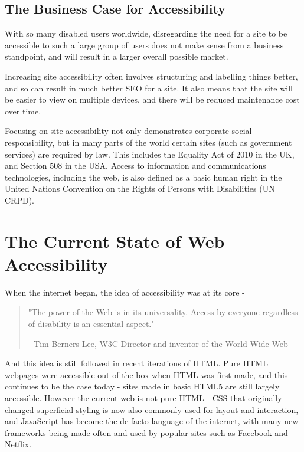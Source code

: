 \documentclass[ %
                    author={Aleena Baig},
                supervisor={Dr Simon Lock},
                    degree={BSc},
                     title={On Making Web Accessible Graphs},
                  subtitle={},
                      year={2019} ]{dissertation}
\begin{document}
\subsection{The Business Case for Accessibility}

With so many disabled users worldwide, disregarding the need for a site to be accessible to such a large group of users does not make sense from a business standpoint, and will result in a larger overall possible market.

Increasing site accessibility often involves structuring and labelling things better, and so can result in much better SEO for a site. It also means that the site will be easier to view on multiple devices, and there will be reduced maintenance cost over time.\cite{WAIaccessibilityintro}

Focusing on site accessibility not only demonstrates corporate social responsibility, but in many parts of the world certain sites (such as government services) are required by law. This includes the Equality Act of 2010 in the UK, and Section 508 in the USA. Access to information and communications technologies, including the web, is also defined as a basic human right in the United Nations Convention on the Rights of Persons with Disabilities (UN CRPD). \cite{accessibilityUN}

\section{The Current State of Web Accessibility}

When the internet began, the idea of accessibility was at its core -

\begin{quote}
\centering
"The power of the Web is in its universality. Access by everyone regardless of disability is an essential aspect."

- Tim Berners-Lee, W3C Director and inventor of the World Wide Web
\end{quote}
%
And this idea is still followed in recent iterations of HTML. Pure HTML webpages were accessible out-of-the-box when HTML was first made, and this continues to be the case today - sites made in basic HTML5 are still largely accessible. However the current web is not pure HTML - CSS that originally changed superficial styling is now also commonly-used for layout and interaction, and JavaScript has become the de facto language of the internet, with many new frameworks being made often and used by popular sites such as Facebook and Netflix.
\end{document}
